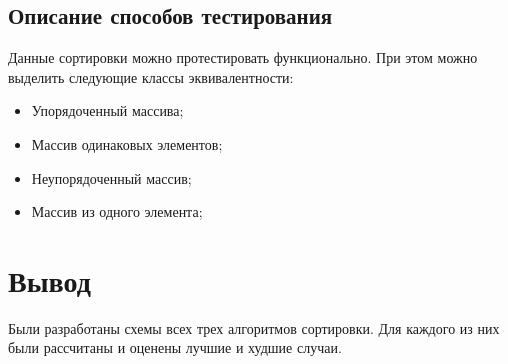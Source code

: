 \subsection{Описание способов тестирования}

Данные сортировки можно протестировать функционально. При этом можно выделить следующие классы эквивалентности: 

\begin{itemize}
    \item Упорядоченный массива;
    \item Массив одинаковых элементов;
    \item Неупорядоченный массив;
    \item Массив из одного элемента;
\end{itemize}


\section*{Вывод}

Были разработаны схемы всех трех алгоритмов сортировки.
Для каждого из них были рассчитаны и оценены лучшие и худшие случаи.
